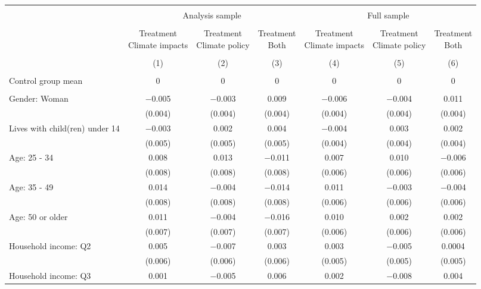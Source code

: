 
\begin{tabular}{@{\extracolsep{5pt}}lcccccc} 
\\[-1.8ex]\hline 
\hline \\[-1.8ex] 
 &  \multicolumn{3}{c}{Analysis sample} & \multicolumn{3}{c}{Full sample} \\ 
\cline{2-7} 
\\[-1.8ex] & \makecell{Treatment\\Climate impacts} & \makecell{Treatment\\Climate policy} & \makecell{Treatment\\Both} & \makecell{Treatment\\Climate impacts} & \makecell{Treatment\\Climate policy} & \makecell{Treatment\\Both} \\ 
\\[-1.8ex] & (1) & (2) & (3) & (4) & (5) & (6)\\ 
\hline \\[-1.8ex] 
Control group mean & 0 & 0 & 0 & 0 & 0 & 0  \\ \hline \\[-1.8ex]
 Gender: Woman & $-$0.005 & $-$0.003 & 0.009 & $-$0.006 & $-$0.004 & 0.011 \\ 
  & (0.004) & (0.004) & (0.004) & (0.004) & (0.004) & (0.004) \\ 
  Lives with child(ren) under 14 & $-$0.003 & 0.002 & 0.004 & $-$0.004 & 0.003 & 0.002 \\ 
  & (0.005) & (0.005) & (0.005) & (0.004) & (0.004) & (0.004) \\ 
  Age: 25 - 34 & 0.008 & 0.013 & $-$0.011 & 0.007 & 0.010 & $-$0.006 \\ 
  & (0.008) & (0.008) & (0.008) & (0.006) & (0.006) & (0.006) \\ 
  Age: 35 - 49 & 0.014 & $-$0.004 & $-$0.014 & 0.011 & $-$0.003 & $-$0.004 \\ 
  & (0.008) & (0.008) & (0.008) & (0.006) & (0.006) & (0.006) \\ 
  Age: 50 or older & 0.011 & $-$0.004 & $-$0.016 & 0.010 & 0.002 & 0.002 \\ 
  & (0.007) & (0.007) & (0.007) & (0.006) & (0.006) & (0.006) \\ 
  Household income: Q2 & 0.005 & $-$0.007 & 0.003 & 0.003 & $-$0.005 & 0.0004 \\ 
  & (0.006) & (0.006) & (0.006) & (0.005) & (0.005) & (0.005) \\ 
  Household income: Q3 & 0.001 & $-$0.005 & 0.006 & 0.002 & $-$0.008 & 0.004 \\ 

\end{tabular}
